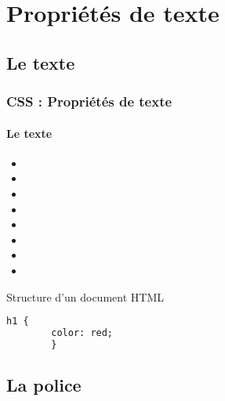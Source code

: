 \documentclass[xcolor=table]{beamer}
\begin{document}
\section{Propriétés de texte}

\subsection{Le texte}

\begin{frame}[fragile]
\frametitle{CSS : Propriétés de texte}
\framesubtitle{Le texte}

\begin{minipage}{0.60\textwidth}
	\begin{itemize}
		\item {}
		\item {}
		\item {}
		\item {}
		\item {}
		\item {}
		\item {}
		\item {}
	\end{itemize}
\end{minipage}
%
\begin{minipage}{0.38\textwidth}
	\begin{block}{Structure d'un document HTML}
		\lstset{escapeinside=**}
		\scriptsize\bfseries
		\begin{lstlisting}[language={html}]
		h1 {
		color: red;
		}
		\end{lstlisting}
	\end{block}
\end{minipage}
\end{frame}

\subsection{La police}
\end{document}
